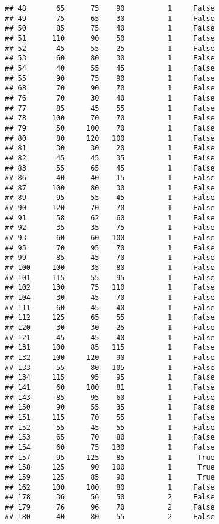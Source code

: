 \documentclass[
]{article}
\begin{document}
\begin{verbatim}
## 48       65      75    90          1     False
## 49       75      65    30          1     False
## 50       85      75    40          1     False
## 51      110      90    50          1     False
## 52       45      55    25          1     False
## 53       60      80    30          1     False
## 54       40      55    45          1     False
## 55       90      75    90          1     False
## 68       70      90    70          1     False
## 76       70      30    40          1     False
## 77       85      45    55          1     False
## 78      100      70    70          1     False
## 79       50     100    70          1     False
## 80       80     120   100          1     False
## 81       30      30    20          1     False
## 82       45      45    35          1     False
## 83       55      65    45          1     False
## 86       40      40    15          1     False
## 87      100      80    30          1     False
## 89       95      55    45          1     False
## 90      120      70    70          1     False
## 91       58      62    60          1     False
## 92       35      35    75          1     False
## 93       60      60   100          1     False
## 95       70      95    70          1     False
## 99       85      45    70          1     False
## 100     100      35    80          1     False
## 101     115      55    95          1     False
## 102     130      75   110          1     False
## 104      30      45    70          1     False
## 111      60      45    40          1     False
## 112     125      65    55          1     False
## 120      30      30    25          1     False
## 121      45      45    40          1     False
## 131     100      85   115          1     False
## 132     100     120    90          1     False
## 133      55      80   105          1     False
## 134     115      95    95          1     False
## 141      60     100    81          1     False
## 143      85      95    60          1     False
## 150      90      55    35          1     False
## 151     115      70    55          1     False
## 152      55      45    55          1     False
## 153      65      70    80          1     False
## 154      60      75   130          1     False
## 157      95     125    85          1      True
## 158     125      90   100          1      True
## 159     125      85    90          1      True
## 162     100     100    80          1     False
## 178      36      56    50          2     False
## 179      76      96    70          2     False
## 180      40      80    55          2     False

\end{verbatim}
\end{document}

